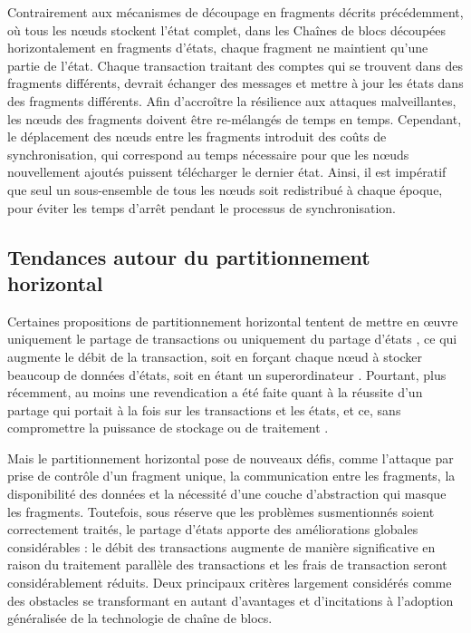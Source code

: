 \documentclass[journal]{IEEEtran}
\begin{document}
Contrairement aux mécanismes de découpage en fragments décrits précédemment, où tous les nœuds stockent l'état complet, dans les Chaînes de blocs découpées horizontalement en fragments d’états, chaque fragment ne maintient qu'une partie de l’état. Chaque transaction traitant des comptes qui se trouvent dans des fragments différents, devrait échanger des messages et mettre à jour les états dans des fragments différents. Afin d'accroître la résilience aux attaques malveillantes, les nœuds des fragments doivent être re-mélangés de temps en temps. Cependant, le déplacement des nœuds entre les fragments introduit des coûts de synchronisation, qui correspond au temps nécessaire pour que les nœuds nouvellement ajoutés puissent télécharger le dernier état. Ainsi, il est impératif que seul un sous-ensemble de tous les nœuds soit redistribué à chaque époque, pour éviter les temps d'arrêt pendant le processus de synchronisation.

\subsection{Tendances autour du partitionnement horizontal}
Certaines propositions de partitionnement horizontal tentent de mettre en œuvre uniquement le partage de transactions \cite{8} ou uniquement du partage d'états \cite{17}, ce qui augmente le débit de la transaction, soit en forçant chaque nœud à stocker beaucoup de données d'états, soit en étant un superordinateur \cite{2}. Pourtant, plus récemment, au moins une revendication a été faite quant à la réussite d’un partage qui portait à la fois sur les transactions et les états, et ce, sans compromettre la puissance de stockage ou de traitement \cite{13}.

Mais le partitionnement horizontal pose de nouveaux défis, comme l'attaque par prise de contrôle d'un fragment unique, la communication entre les fragments, la disponibilité des données et la nécessité d'une couche d'abstraction qui masque les fragments. Toutefois, sous réserve que les problèmes susmentionnés soient correctement traités, le partage d’états apporte des améliorations globales considérables : le débit des transactions augmente de manière significative en raison du traitement parallèle des transactions et les frais de transaction seront considérablement réduits. Deux principaux critères largement considérés comme des obstacles se transformant en autant d’avantages et d’incitations à l'adoption généralisée de la technologie de chaîne de blocs.
\end{document}
